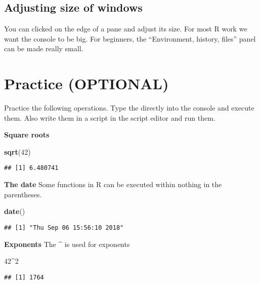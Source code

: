 \documentclass[]{book}
\newenvironment{Shaded}{\begin{snugshade}}{\end{snugshade}}
\newcommand{\KeywordTok}[1]{\textcolor[rgb]{0.13,0.29,0.53}{\textbf{#1}}}
\newcommand{\DecValTok}[1]{\textcolor[rgb]{0.00,0.00,0.81}{#1}}
\newcommand{\OperatorTok}[1]{\textcolor[rgb]{0.81,0.36,0.00}{\textbf{#1}}}
\newcommand{\NormalTok}[1]{#1}
\theoremstyle{definition}
\theoremstyle{definition}
\theoremstyle{definition}
\theoremstyle{remark}
\begin{document}
\subsection{Adjusting size of windows}\label{adjusting-size-of-windows}

You can clicked on the edge of a pane and adjust its size. For most R
work we want the console to be big. For beginners, the ``Environment,
history, files'' panel can be made really small.

\section{Practice (OPTIONAL)}\label{practice-optional}

Practice the following operations. Type the directly into the console
and execute them. Also write them in a script in the script editor and
run them.

\textbf{Square roots}

\begin{Shaded}
\begin{Highlighting}[]
\KeywordTok{sqrt}\NormalTok{(}\DecValTok{42}\NormalTok{)}
\end{Highlighting}
\end{Shaded}

\begin{verbatim}
## [1] 6.480741
\end{verbatim}

\textbf{The date} Some functions in R can be executed within nothing in
the parentheses.

\begin{Shaded}
\begin{Highlighting}[]
\KeywordTok{date}\NormalTok{()}
\end{Highlighting}
\end{Shaded}

\begin{verbatim}
## [1] "Thu Sep 06 15:56:10 2018"
\end{verbatim}

\textbf{Exponents} The \textbf{\^{}} is used for exponents

\begin{Shaded}
\begin{Highlighting}[]
\DecValTok{42}\OperatorTok{^}\DecValTok{2}
\end{Highlighting}
\end{Shaded}

\begin{verbatim}
## [1] 1764
\end{verbatim}
\end{document}
